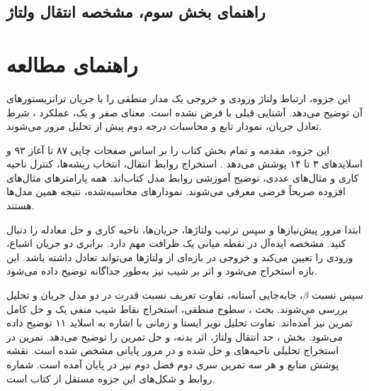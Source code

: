 \ifCompleteNotes
\section*{راهنمای بخش سوم، مشخصه انتقال ولتاژ}
\else
\chapter*{راهنمای مطالعه}
\fi
این جزوه، ارتباط ولتاژ ورودی و خروجی یک مدار منطقی را با جریان
ترانزیستورهای آن توضیح می‌دهد. آشنایی قبلی با 
فرض نشده است. معنای صفر و یک، عملکرد ، شرط تعادل جریان،
نمودار تابع و محاسبات درجه دوم پیش از تحلیل مرور می‌شوند.

این جزوه، مقدمه و تمام بخش  کتاب را بر اساس
صفحات چاپی ۸۷ تا آغاز ۹۳ و اسلایدهای ۳ تا ۱۴
 پوشش می‌دهد \cite{weste,dcslides}. استخراج روابط انتقال،
انتخاب ریشه‌ها، کنترل ناحیه کاری و مثال‌های عددی، توضیح آموزشی
روابط مدل کتاب‌اند. همه پارامترهای مثال‌های افزوده صریحاً فرضی
معرفی می‌شوند. نمودارهای محاسبه‌شده، نتیجه همین مدل‌ها هستند.

ابتدا مرور پیش‌نیازها و سپس ترتیب ولتاژها، جریان‌ها، ناحیه کاری و
حل معادله را دنبال کنید. مشخصه ایده‌آل در نقطه میانی یک ظرافت
مهم دارد. برابری دو جریان اشباع، ورودی را تعیین می‌کند و خروجی
در بازه‌ای از ولتاژها می‌تواند تعادل داشته باشد. این بازه استخراج
می‌شود و اثر  بر شیب نیز
به‌طور جداگانه توضیح داده می‌شود.

سپس نسبت \(\beta\)، جابه‌جایی آستانه، تفاوت تعریف نسبت قدرت در
دو مدل جریان و تحلیل  بررسی می‌شوند.
بحث ، سطوح منطقی، استخراج نقاط شیب منفی یک و
حل کامل تمرین  نیز آمده‌اند. تفاوت تحلیل نویز ایستا و زمانی
با اشاره به اسلاید ۱۱ توضیح داده می‌شود.
بخش ، حد انتقال ولتاژ، اثر بدنه،
 و حل تمرین  را توضیح می‌دهد.
تمرین  در استخراج تحلیلی ناحیه‌های  و 
حل شده و در مرور پایانی مشخص شده است. نقشه پوشش منابع و هر سه
تمرین سری دوم فصل دوم نیز در پایان آمده است.
شماره روابط و شکل‌های این جزوه مستقل از کتاب است.

